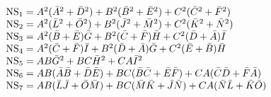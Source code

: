 \begin{equation*}
  \begin{array}{ll}
{\rm NS}_1 = A^2 (\bar{A}^2 +\bar{D}^2) +B^2(\bar{B}^2 +\bar{E}^2)
+C^2(\bar{C}^2 +\bar{F}^2) \\
{\rm NS}_2 = A^2 (\bar{L}^2 +\bar{O}^2) +B^2(\bar{J}^2 +\bar{M}^2)
+C^2(\bar{K}^2 +\bar{N}^2) \\
{\rm NS}_3 = A^2 (\bar{B} +\bar{E})\bar{G} +B^2
(\bar{C} +\bar{F})\bar{H} +C^2 (\bar{D} +\bar{A})\bar{I} \\
{\rm NS}_4 =  A^2 (\bar{C} +\bar{F})\bar{I} +B^2 (\bar{D} +\bar{A})\bar{G} +C^2
(\bar{E}+\bar{B})\bar{H} \\
{\rm NS}_5 = AB \bar{G}^2 +BC \bar{H}^2 +CA \bar{I}^2 \\
{\rm NS}_6 = AB (\bar{A}\bar{B}+\bar{D}\bar{E})
+BC(\bar{B}\bar{C}+\bar{E}\bar{F}) +CA(\bar{C}\bar{D}+\bar{F}\bar{A}) \\
{\rm NS}_7 = AB (\bar{L}\bar{J}+\bar{O}\bar{M})
+BC(\bar{M}\bar{K}+\bar{J}\bar{N}) +CA(\bar{N}\bar{L}+\bar{K}\bar{O}) \\
  \end{array}
\end{equation*}

